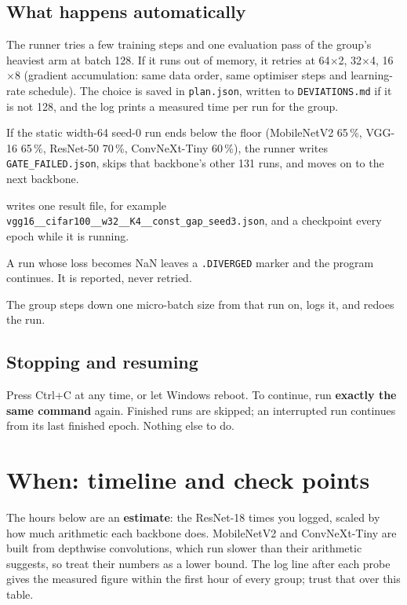 \documentclass[10.5pt,a4paper]{article}
\newcommand{\cmd}[1]{\texttt{#1}}
\begin{document}
\subsection{What happens automatically}
\begin{description}[leftmargin=1.2em,style=nextline]
\item[Probe (a few minutes before each group)] The runner tries a few training steps and one evaluation pass of the group's heaviest arm at batch 128. If it runs out of memory, it retries at 64$\times$2, 32$\times$4, 16$\times$8 (gradient accumulation: same data order, same optimiser steps and learning-rate schedule). The choice is saved in \cmd{plan.json}, written to \cmd{DEVIATIONS.md} if it is not 128, and the log prints a measured time per run for the group.
\item[Gate (the first run of each backbone)] If the static width-64 seed-0 run ends below the floor (MobileNetV2 65\,\%, VGG-16 65\,\%, ResNet-50 70\,\%, ConvNeXt-Tiny 60\,\%), the runner writes \cmd{GATE\_FAILED.json}, skips that backbone's other 131 runs, and moves on to the next backbone.
\item[Each run] writes one result file, for example \cmd{vgg16\_\_cifar100\_\_w32\_\_K4\_\_const\_gap\_seed3.json}, and a checkpoint every epoch while it is running.
\item[Divergence] A run whose loss becomes NaN leaves a \cmd{.DIVERGED} marker and the program continues. It is reported, never retried.
\item[Out of memory mid-run] The group steps down one micro-batch size from that run on, logs it, and redoes the run.
\end{description}

\subsection{Stopping and resuming}
Press Ctrl+C at any time, or let Windows reboot. To continue, run \textbf{exactly the same command} again. Finished runs are skipped; an interrupted run continues from its last finished epoch. Nothing else to do.

\section{When: timeline and check points}\label{sec:when}

The hours below are an \textbf{estimate}: the ResNet-18 times you logged, scaled by how much arithmetic each backbone does. MobileNetV2 and ConvNeXt-Tiny are built from depthwise convolutions, which run slower than their arithmetic suggests, so treat their numbers as a lower bound. The log line after each probe gives the measured figure within the first hour of every group; trust that over this table.
\end{document}
